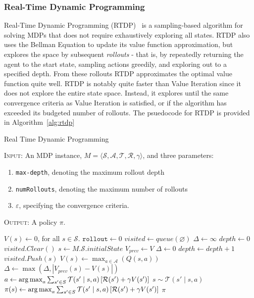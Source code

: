 \documentclass[11pt]{article}
\begin{document}
\subsubsection{Real-Time Dynamic Programming}
Real-Time Dynamic Programming (RTDP)~\cite{barto1995learning} is a sampling-based algorithm for solving MDPs that does not require exhaustively exploring all states. RTDP also uses the Bellman Equation to update its value function approximation, but explores the space by subsequent {\it rollouts} - that is, by repeatedly returning the agent to the start state, sampling actions greedily, and exploring out to a specified depth. From these rollouts RTDP approximates the optimal value function quite well. RTDP is notably quite faster than Value Iteration since it does not explore the entire state space. Instead, it explores until the same convergence criteria as Value Iteration is satisfied, or if the algorithm has exceeded its budgeted number of rollouts. The psuedocode for RTDP is provided in Algorithm~\ref{alg:rtdp}

\begin{algorithm}
\caption{Real Time Dynamic Programming}
\textsc{Input:} An MDP instance, $M = \langle \mathcal{S}, \mathcal{A}, \mathcal{T}, \mathcal{R}, \gamma \rangle$, and three parameters: 
\begin{enumerate}
\item \texttt{max-depth}, denoting the maximum rollout depth
\item \texttt{numRollouts}, denoting the maximum number of rollouts
\item $\varepsilon$, specifying the convergence criteria.
\end{enumerate}
\textsc{Output:} A policy $\pi$.
\begin{algorithmic}[1]
\State $V(s) \gets 0$, for all $s \in \mathcal{S}$.
\State $\texttt{rollout} \gets 0$
\State $visited \gets queue(\varnothing)$
\State $\Delta \gets \infty$
\State $depth \gets 0$
\State $visited.Clear()$
\State $s \gets M.\mathcal{S}.initialState$
\State $V_{prev} \gets V$
\State $\Delta \gets 0$
\State $depth \gets depth + 1$
\State $visited.Push(s)$
\State $V(s) \gets \max_{a \in \mathcal{A}} (Q(s,a))$
\State $\Delta \gets \max(\Delta, |V_{prev}(s) - V(s)|)$
\State $a \gets \operatorname*{arg\,max}_a \sum_{s' \in S} \mathcal{T}(s' \mid s, a) \left[\mathcal{R}(s') + \gamma V(s') \right]$
\State $s \sim \mathcal{T}(s' \mid s,a)$
\EndWhile
\EndWhile
{}
\State $\pi(s) \gets \operatorname*{arg\,max}_a \sum_{s' \in S} \mathcal{T}(s' \mid s, a) \left[\mathcal{R}(s') + \gamma V(s') \right]$
\EndFor
{} $\pi$
\end{algorithmic}
\label{alg:rtdp}
\end{algorithm}
\end{document}
